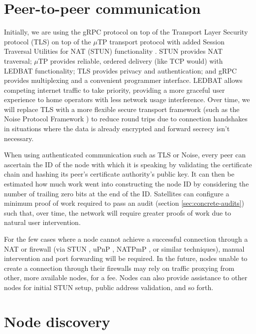 \documentclass[8pt,fleqn,openany]{book}
\begin{document}
\section{Peer-to-peer communication}\label{sec:concrete-p2p-comms}

Initially, we are using the gRPC \cite{grpc} protocol on top of the
Transport Layer Security protocol (TLS) \cite{tls} on top of the $\mu$TP
\cite{utp} transport protocol with added Session Traversal Utilities for NAT
(STUN) functionality \cite{stun}.
STUN provides NAT traversal; $\mu$TP provides reliable,
ordered delivery (like TCP would) with LEDBAT \cite{ledbat} functionality;
TLS provides privacy and authentication;
and gRPC provides multiplexing and a convenient programmer interface.
LEDBAT allows competing internet traffic to take priority, providing a more
graceful user experience to home operators with less network usage interference.
Over time, we will replace TLS with a more flexible secure transport
framework (such as the Noise Protocol Framework \cite{noise-proto}) to
reduce round trips due to connection handshakes in situations where the data is
already encrypted and forward secrecy isn't necessary.

When using authenticated communication such as TLS or Noise, every peer can
ascertain the ID of the node with which it is
speaking by validating the certificate chain and hashing its peer's
certificate authority's public key. It can then be estimated how much work went
into constructing the node ID by considering the number of trailing zero bits
at the end of the ID.
Satellites can configure a minimum proof of work required to pass an
audit (section \ref{sec:concrete-audits})
such that, over time, the network will require greater proofs of work
due to natural user intervention.

For the few cases where a node cannot achieve a successful connection through a
NAT or firewall (via STUN \cite{stun}, uPnP \cite{upnp}, NATPmP \cite{natpmp},
or similar techniques), manual
intervention and port forwarding will be required. In the future, nodes unable
to create a connection through their firewalls may rely on traffic proxying from
other, more available nodes, for a fee. Nodes can also provide
assistance to other nodes for initial STUN setup, public address validation,
and so forth.

\section{Node discovery}\label{sec:concrete-node-discovery}
\end{document}
